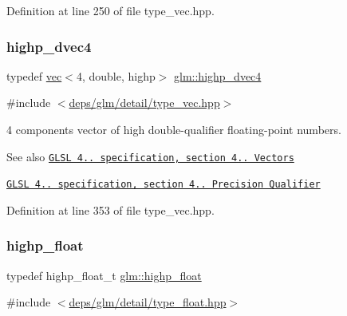 Definition at line 250 of file type\+\_\+vec.\+hpp.

\mbox{\label{group__core__precision_ga6e8645fa38f0260e57f1fb7555de0c2f}} 
\subsubsection{\texorpdfstring{highp\+\_\+dvec4}{highp\_dvec4}}
{\footnotesize\ttfamily typedef \hyperlink{structglm_1_1vec}{vec}$<$4, double, highp$>$ \hyperlink{group__core__precision_ga6e8645fa38f0260e57f1fb7555de0c2f}{glm\+::highp\+\_\+dvec4}}



{\ttfamily \#include $<$\hyperlink{type__vec_8hpp}{deps/glm/detail/type\+\_\+vec.\+hpp}$>$}

4 components vector of high double-\/qualifier floating-\/point numbers.

\begin{DoxySeeAlso}{See also}
\href{http://www.opengl.org/registry/doc/GLSLangSpec.4.20.8.pdf}{\tt G\+L\+SL 4.. specification, section 4.. Vectors} 

\href{http://www.opengl.org/registry/doc/GLSLangSpec.4.20.8.pdf}{\tt G\+L\+SL 4.. specification, section 4.. Precision Qualifier} 
\end{DoxySeeAlso}


Definition at line 353 of file type\+\_\+vec.\+hpp.

\mbox{\label{group__core__precision_ga3d443a093adc053638ed7f81c5bfe300}} 
\subsubsection{\texorpdfstring{highp\+\_\+float}{highp\_float}}
{\footnotesize\ttfamily typedef highp\+\_\+float\+\_\+t \hyperlink{group__core__precision_ga3d443a093adc053638ed7f81c5bfe300}{glm\+::highp\+\_\+float}}



{\ttfamily \#include $<$\hyperlink{type__float_8hpp}{deps/glm/detail/type\+\_\+float.\+hpp}$>$}

